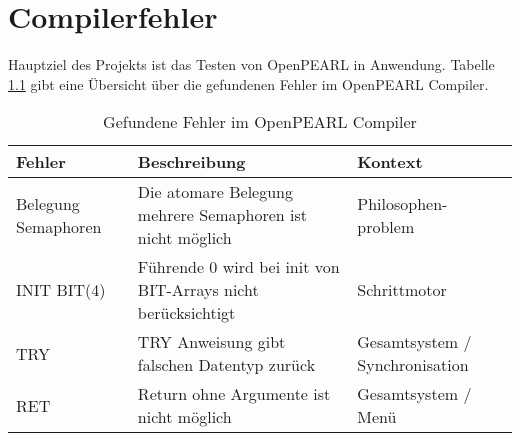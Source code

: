 \chapter{Compilerfehler}
Hauptziel des Projekts ist das Testen von OpenPEARL in Anwendung. Tabelle  \ref{tab:fehler} gibt eine Übersicht über die gefundenen Fehler im OpenPEARL Compiler.

	\begin{table}[H]
	
	\begin{center}
		\renewcommand{\arraystretch}{1.2}
		\begin{tabular}{|p{}|p{}|p{}|}
			\hline
			\textbf{Fehler} & \textbf{Beschreibung} & \textbf{Kontext}\\
			\hline
			Belegung Semaphoren & Die atomare Belegung mehrere Semaphoren ist nicht möglich & Philosophen-problem \\
			\hline
			INIT BIT(4) & Führende 0 wird bei init von BIT-Arrays nicht berücksichtigt & Schrittmotor \\
			\hline
			TRY & TRY Anweisung gibt falschen Datentyp zurück & Gesamtsystem / Synchronisation \\
			\hline
			RET & Return ohne Argumente ist nicht möglich & Gesamtsystem / Menü \\
			\hline
			
		\end{tabular}
	\end{center}
	\caption{Gefundene Fehler im OpenPEARL Compiler}\label{tab:fehler}
\end{table}